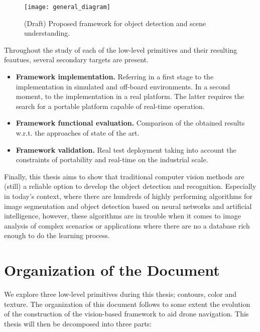 \begin{figure}[!ht]
    \centering
    \texttt{[image: general\_diagram]}        
    \caption{(Draft) Proposed framework for object detection and scene understanding.}\label{fig:general_diagram_framework}
\end{figure}

Throughout the study of each of the low-level primitives and their resulting feautues, several secondary targets are present.

\begin{itemize}
	\item \textbf{Framework implementation.} Referring in a first stage to the implementation in simulated and off-board environments. In a second moment, to the implementation in a real platform. The latter requires the search for a portable platform capable of real-time operation.
 
	\item \textbf{Framework functional evaluation.} Comparison of the obtained results w.r.t. the approaches of state of the art.
 
 	\item \textbf{Framework validation.} Real test deployment taking into account the constraints of portability and real-time on the industrial scale.
 
\end{itemize}

Finally, this thesis aims to show that traditional computer vision methods are (still) a reliable option to develop the object detection and recognition. Especially in today's context, where there are hundreds of highly performing algorithms for image segmentation and object detection based on neural networks and artificial intelligence, however, these algorithms are in trouble when it comes to image analysis of complex scenarios or applications where there are no a database rich enough to do the learning process.


\section*{Organization of the Document}

We explore three low-level primitives during this thesis; contours, color and texture. The organization of this document follows to some extent the evolution of the construction of the vision-based framework to aid drone navigation. This thesis will then be decomposed into three parts:

